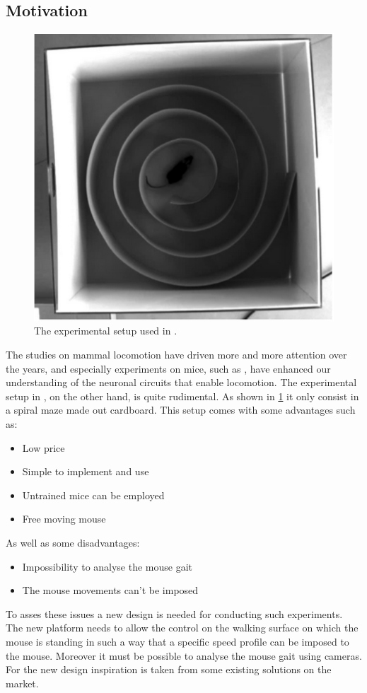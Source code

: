 \documentclass[12pt,a4paper]{article}
\begin{document}
\subsection{Motivation}
\begin{figure}
	\includegraphics[width=\linewidth]{fig/OleSetup.png}
	\caption{The experimental setup used in \cite{Ole}.}\label{fig:OleSetup}
	\vspace{-2 cm}
\end{figure}
The studies on mammal locomotion have driven more and more attention over the years, and especially experiments on mice, such as \cite{Ole}, have enhanced our understanding of the neuronal circuits that enable locomotion. The experimental setup in \cite{Ole}, on the other hand, is quite rudimental. As shown in \ref{fig:OleSetup} it only consist in a spiral maze made out cardboard. This setup comes with some advantages such as:
\begin{itemize}
	\item Low price
	\item Simple to implement and use
	\item Untrained mice can be employed
	\item Free moving mouse
\end{itemize}
As well as some disadvantages:
\begin{itemize}
	\item Impossibility to analyse the mouse gait
	\item The mouse movements can't be imposed
\end{itemize}
To asses these issues a new design is needed for conducting such experiments. The new platform needs to allow the control on the walking surface on which the mouse is standing in such a way that a specific speed profile can be imposed to the mouse. Moreover it must be possible to analyse the mouse gait using cameras. \\
For the new design inspiration is taken from some existing solutions on the market. 
\end{document}
